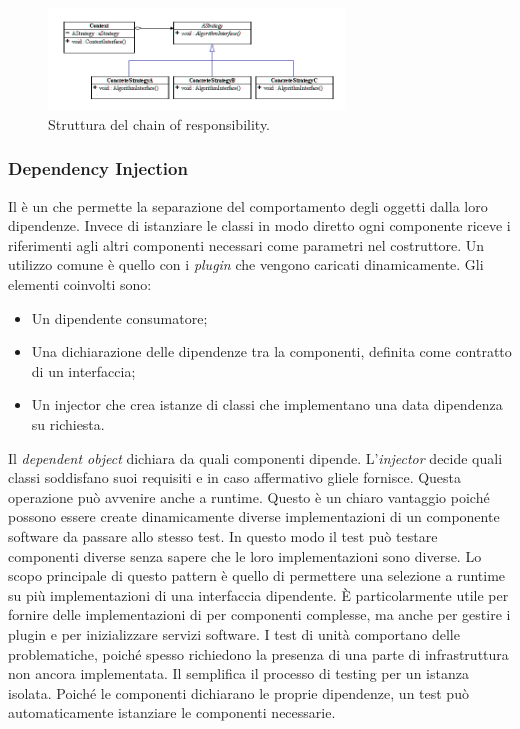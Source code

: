 \begin{figure}[h]
\centering \includegraphics[width=0.7\textwidth]{patterns/strategy.jpg}
\caption{Struttura del chain of responsibility.}
\label{fig:strategy}
\end{figure}
	
\subsubsection{Dependency Injection}

Il  è un  che permette la separazione del comportamento degli oggetti dalla loro dipendenze. Invece di istanziare le classi in modo diretto ogni componente riceve i riferimenti agli altri componenti necessari come parametri nel costruttore. Un utilizzo comune è quello con i 	\emph{plugin} che vengono caricati dinamicamente. Gli elementi coinvolti sono:
	
\begin{itemize}
	\item Un dipendente consumatore;
	\item Una dichiarazione delle dipendenze tra la componenti, definita come contratto di un interfaccia;
	\item Un injector che crea istanze di classi che implementano una data dipendenza su richiesta.

\end{itemize}

Il \textit{dependent object} dichiara da quali componenti dipende. L'\textit{injector} decide quali classi soddisfano suoi requisiti e in caso affermativo gliele fornisce. Questa operazione può avvenire anche a runtime. Questo è un chiaro vantaggio poiché possono essere create dinamicamente diverse implementazioni di un componente software da passare allo stesso test. In questo modo il test può testare componenti diverse senza sapere che le loro implementazioni sono diverse.
Lo scopo principale di questo pattern è quello di permettere una selezione a runtime su più implementazioni di una interfaccia dipendente. È particolarmente utile per fornire delle implementazioni di  per componenti complesse, ma anche per gestire i plugin e per inizializzare servizi software. I test di unità comportano delle problematiche, poiché spesso richiedono la presenza di una parte di infrastruttura non ancora implementata. Il  semplifica il processo di testing per un istanza isolata. Poiché le componenti dichiarano le proprie dipendenze, un test può automaticamente istanziare le componenti necessarie.
	 
